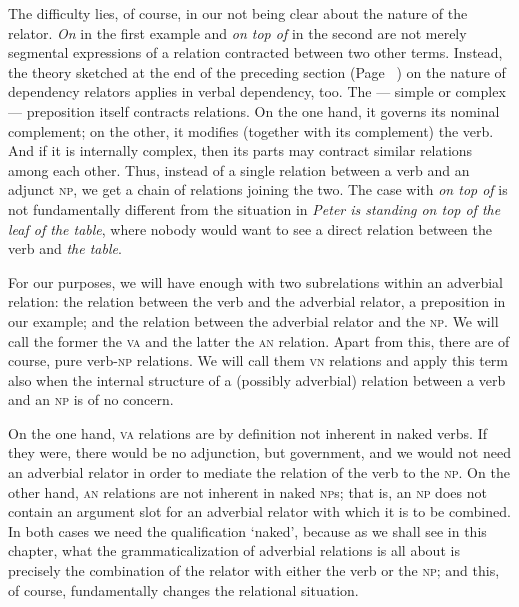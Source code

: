 The difficulty lies, of course, in our not being clear about the nature of the relator. \textit{On} in the first example and \textit{on top of} in the second are not merely segmental expressions of a relation contracted between two other terms. Instead, the theory sketched at the end of the preceding section (Page~\pageref{page78}\chk%
) on the nature of dependency relators applies in verbal dependency, too. The — simple or complex — preposition itself contracts relations. On the one hand, it governs its nominal complement; on the other, it modifies (together with its complement) the verb. And if it is internally complex, then its parts may contract similar relations among each other. Thus, instead of a single relation between a verb and an adjunct \textsc{np}, we get a chain of relations joining the two. The case with \textit{on top of} is not fundamentally different from the situation in \textit{Peter is standing on top of the leaf of the table}, where nobody would want to see a direct relation between the verb and \textit{the table}.

For our purposes, we will have enough with two subrelations within an adverbial relation: the relation between the verb and the adverbial relator, a preposition in our example; and the relation between the adverbial relator and the \textsc{np}. We will call the former the \textsc{va} and the latter the \textsc{an} relation. Apart from this, there are of course, pure verb-\textsc{np} relations. We will call them \textsc{vn} relations and apply this term also when the internal structure of a (possibly adverbial) relation between a verb and an \textsc{np} is of no concern.

On the one hand, \textsc{va} relations are by definition not inherent in naked verbs. If they were, there would be no adjunction, but government, and we would not need an adverbial relator in order to mediate the relation of the verb to the \textsc{np}. On the other hand, \textsc{an} relations are not inherent in naked \textsc{np}s; that is, an \textsc{np} does not contain an argument slot for an adverbial relator with which it is to be combined. In both cases we need the qualification ‘naked’, because as we shall see in this chapter, what the grammaticalization of adverbial relations is all about is precisely the combination of the relator with either the verb or the \textsc{np}; and this, of course, fundamentally changes the relational situation.

